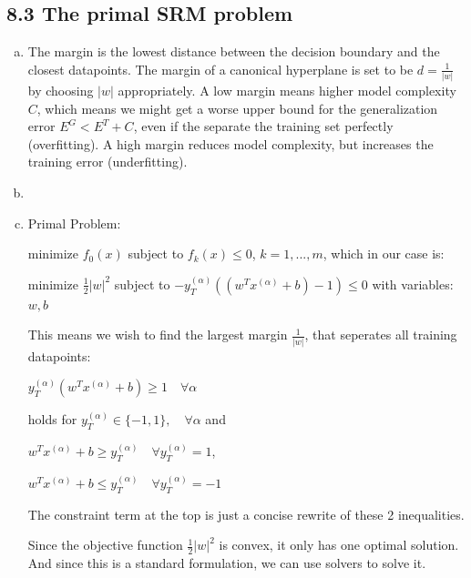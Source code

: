 \documentclass[10pt,a4paper]{article}
\begin{document}
\subsection*{8.3 The primal SRM problem}
\begin{enumerate}[a)]
\item
The margin is the lowest distance between the decision boundary and the closest datapoints. The margin of a canonical hyperplane is set to be $d = \frac{1}{|w|}$ by choosing $|w|$ appropriately.
A low margin means higher model complexity $C$, which means we might get a worse upper bound for the generalization error $E^G < E^T + C$, even if the separate the training set perfectly (overfitting).
A high margin reduces model complexity, but increases the training error (underfitting).
\item

\item
Primal Problem:

minimize $f_{0}(x)$ subject to $f_{k}(x) \leq 0$, $k=1,...,m$, which in our case is:

minimize $\frac{1}{2}|w|^2$ subject to $-y_T^{(\alpha)}((w^Tx^{(\alpha)}+b)-1) \leq 0$
with variables: $w, b$

This means we wish to find the largest margin $\frac{1}{|w|}$, that seperates all training datapoints:

$y_T^{(\alpha)}(w^Tx^{(\alpha)} + b) \geq 1 \quad \forall \alpha$

holds for
$y_T^{(\alpha)} \in \{-1, 1\}, \quad \forall \alpha$ and

$ w^Tx^{(\alpha)} + b \geq y_T^{(\alpha)} \quad \forall y_T^{(\alpha)} = 1$,

$ w^Tx^{(\alpha)} + b \leq y_T^{(\alpha)} \quad \forall y_T^{(\alpha)} = -1$

The constraint term at the top is just a concise rewrite of these 2 inequalities.

Since the objective function $\frac{1}{2}|w|^2$ is convex, it only has one optimal solution. And since this is a standard formulation, we can use solvers to solve it.
\end{enumerate}

\end{document}
